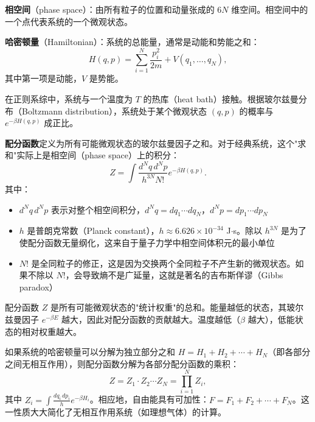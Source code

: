 \begin{definition}[相空间]
\textbf{相空间}（phase space）：由所有粒子的位置和动量张成的 $6N$ 维空间。相空间中的一个点代表系统的一个微观状态。
\end{definition}

\begin{definition}[哈密顿量]
\textbf{哈密顿量}（Hamiltonian）：系统的总能量，通常是动能和势能之和：
\begin{equation}
    H(q, p) = \sum_{i=1}^{N} \frac{p_i^2}{2m} + V(q_1, \ldots, q_N),
\end{equation}
其中第一项是动能，$V$ 是势能。
\end{definition}

在正则系综中，系统与一个温度为 $T$ 的热库（heat bath）接触。根据玻尔兹曼分布（Boltzmann distribution），系统处于某个微观状态 $(q, p)$ 的概率与 $e^{-\beta H(q, p)}$ 成正比。

\begin{theorem}[经典正则配分函数]
\textbf{配分函数}定义为所有可能微观状态的玻尔兹曼因子之和。对于经典系统，这个"求和"实际上是相空间（phase space）上的积分：
\begin{equation}
    Z = \int \frac{d^N q \, d^N p}{h^{3N} N!} e^{-\beta H(q, p)}.
    \label{eq:classical_Z}
\end{equation}
其中：
\begin{itemize}
    \item $d^N q \, d^N p$ 表示对整个相空间积分，$d^N q = dq_1 \cdots dq_N$，$d^N p = dp_1 \cdots dp_N$
    \item $h$ 是普朗克常数（Planck constant），$h \approx 6.626 \times 10^{-34}$ J$\cdot$s。除以 $h^{3N}$ 是为了使配分函数无量纲化，这来自于量子力学中相空间体积元的最小单位
    \item $N!$ 是全同粒子的修正，这是因为交换两个全同粒子不产生新的微观状态。如果不除以 $N!$，会导致熵不是广延量，这就是著名的吉布斯佯谬（Gibbs paradox）
\end{itemize}
\end{theorem}

\begin{note}
配分函数 $Z$ 是所有可能微观状态的"统计权重"的总和。能量越低的状态，其玻尔兹曼因子 $e^{-\beta E}$ 越大，因此对配分函数的贡献越大。温度越低（$\beta$ 越大），低能状态的相对权重越大。
\end{note}

\begin{property}[非相互作用系统的配分函数分解]
如果系统的哈密顿量可以分解为独立部分之和 $H = H_1 + H_2 + \cdots + H_N$（即各部分之间无相互作用），则配分函数分解为各部分配分函数的乘积：
\begin{equation}
    Z = Z_1 \cdot Z_2 \cdots Z_N = \prod_{i=1}^N Z_i,
\end{equation}
其中 $Z_i = \int \frac{dq_i \, dp_i}{h} e^{-\beta H_i}$。相应地，自由能具有可加性：$F = F_1 + F_2 + \cdots + F_N$。这一性质大大简化了无相互作用系统（如理想气体）的计算。
\end{property}

